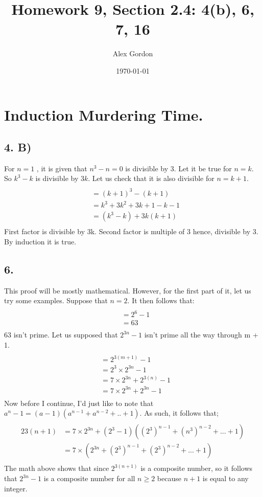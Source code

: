 \documentclass[12]{scrartcl}
\begin{document}
\title{Homework 9, Section 2.4: 4(b), 6, 7, 16 }
\author{Alex Gordon}
\date{\today}
\maketitle
\section*{Induction Murdering Time.}
\subsection*{4. B)}
For $n=1$ , it is given that $n^3-n=0 $ is divisible by 3. Let it be true for $n=k$. 
So $k^3-k$ is divisible by $3k$. Let us check that it is also divisible for $n=k+1$.\
\begin{align*} 
\\&= (k+1)^3-(k+1)
\\  &= k^3+3k^2+3k+1-k-1
\\ &=(k^3-k) + 3k(k+1)\\
\end{align*}
First factor is divisible by 3k. Second factor is multiple of 3 hence, divisible by 3. By induction it is true.
\subsection*{6.}
This proof will be mostly mathematical. However, for the first part of it, let us try some examples. Suppose that $n = 2$. It then follows that:\\
\begin{align*} 
\\&= 2^6 - 1
\\  &= 63\\
\end{align*}
63 isn't prime. Let us supposed that $2^{3n} - 1$ isn't prime all the way through m + 1. 
\begin{align*} 
\\ & =  2^{3(m+1)} - 1
\\&= 2^3 \times 2^{3n} - 1
\\&= 7 \times 2^{3n} +  2^{3(n)} - 1
\\&= 7 \times 2^{3n} +  2^{3n} - 1\\
\end{align*}
Now before I continue, I'd just like to note that $a^n - 1 = (a - 1)(a^{n-1} + a^{n-2} + .. + 1)$. As such, it follows that;
\begin{align*} 
\\2{3(n+1)}  &= 7 \times 2^{3n} + (2^3 -1)((2^3)^{n-1} + (n^3)^{n-2} + ... + 1)
\\&= 7 \times (2^{3n} + (2^3)^{n-1} + (2^3)^{n-2} + ... + 1)\\
\end{align*}
The math above shows that since $2^{3(n+1)}$ is a composite number, so it follows that  $2^{3n} - 1$ is a composite number for all $n \geq 2$ because $n + 1$ is equal to any integer. 
\end{document}
